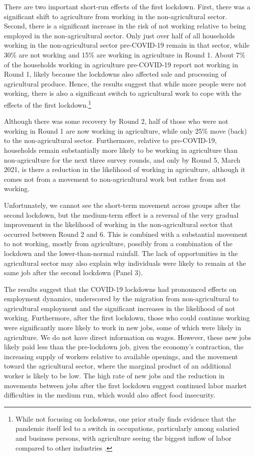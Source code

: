 \documentclass{wber}
\begin{document}
There are two important short-run effects of the first lockdown. First,
there was a significant shift to agriculture from working in the
non-agricultural sector. Second, there is a significant increase in the
risk of not working relative to being employed in the non-agricultural
sector. Only just over half of all households working in the
non-agricultural sector pre-COVID-19 remain in that sector, while 30\%
are not working and 15\% are working in agriculture in Round 1. About
7\% of the households working in agriculture pre-COVID-19 report not
working in Round 1, likely because the lockdowns also affected sale and
processing of agricultural produce. Hence, the results suggest that
while more people were not working, there is also a significant switch
to agricultural work to cope with the effects of the first
lockdown.\footnote{While not focusing on lockdowns, one prior study
  finds evidence that the pandemic itself led to a switch in
  occupations, particularly among salaried and business persons, with
  agriculture seeing the biggest inflow of labor compared to other
  industries \citep{Gupta2021}.}

Although there was some recovery by Round 2, half of those who were not
working in Round 1 are now working in agriculture, while only 25\% move
(back) to the non-agricultural sector. Furthermore, relative to
pre-COVID-19, households remain substantially more likely to be working
in agriculture than non-agriculture for the next three survey rounds,
and only by Round 5, March 2021, is there a reduction in the likelihood
of working in agriculture, although it comes not from a movement to
non-agricultural work but rather from not working.

Unfortunately, we cannot see the short-term movement across groups after
the second lockdown, but the medium-term effect is a reversal of the
very gradual improvement in the likelihood of working in the
non-agricultural sector that occurred between Round 2 and 6. This is
combined with a substantial movement to not working, mostly from
agriculture, possibly from a combination of the lockdown and the
lower-than-normal rainfall. The lack of opportunities in the
agricultural sector may also explain why individuals were likely to
remain at the same job after the second lockdown (Panel 3).

The results suggest that the COVID-19 lockdowns had pronounced effects
on employment dynamics, underscored by the migration from
non-agricultural to agricultural employment and the significant
increases in the likelihood of not working. Furthermore, after the first
lockdown, those who could continue working were significantly more
likely to work in new jobs, some of which were likely in agriculture. We
do not have direct information on wages. However, these new jobs likely
paid less than the pre-lockdown job, given the economy's contraction,
the increasing supply of workers relative to available openings, and the
movement toward the agricultural sector, where the marginal product of
an additional worker is likely to be low. The high rate of new jobs and
the reduction in movements between jobs after the first lockdown suggest
continued labor market difficulties in the medium run, which would also
affect food insecurity.
\end{document}
